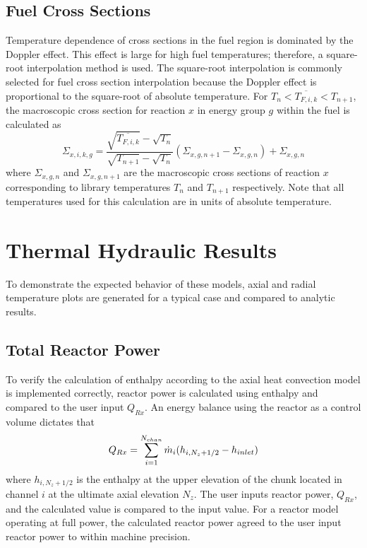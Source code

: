   \subsection{Fuel Cross Sections}
    Temperature dependence of cross sections in the fuel region is dominated by
    the Doppler effect. This effect is large for high fuel temperatures;
    therefore, a square-root interpolation method is used. The square-root
    interpolation is commonly selected for fuel cross section interpolation 
    because the Doppler effect is proportional to the square-root of absolute
    temperature. For ${T_n < \overline{T_{F,i,k}} < T_{n+1}}$, the macroscopic 
    cross section for reaction $x$ in energy group $g$ within the fuel is
    calculated as 
    \begin{equation}
      \Sigma_{x,i,k,g} = 
        \frac{\sqrt{\overline{T_{F,i,k}}} - \sqrt{T_{n}}}
        {\sqrt{T_{n+1}}-\sqrt{T_{n}}}
        (\Sigma_{x,g,n+1} - \Sigma_{x,g,n})  + \Sigma_{x,g,n}
    \end{equation}
    where $\Sigma_{x,g,n}$ and $\Sigma_{x,g,n+1}$ are the macroscopic
    cross sections of reaction $x$ corresponding to library temperatures $T_n$
    and $T_{n+1}$ respectively. Note that all temperatures used for this 
    calculation are in units of absolute temperature.
      
\section{Thermal Hydraulic Results}
  To demonstrate the expected behavior of these models, axial and radial
  temperature plots are generated for a typical case and compared to analytic
  results.
  
  \subsection{Total Reactor Power}
    To verify the calculation of enthalpy according to the axial heat convection
    model is implemented correctly, reactor power is calculated using enthalpy
    and compared to the user input $Q_{Rx}$. An energy balance using the reactor
    as a control volume dictates that
    \begin{equation}
      \label{eq:reactor_energy_balance}
      Q_{Rx} = \sum_{i=1}^{N_{chan}} \dot{m}_i (h_{i,N_z+1/2} - h_{inlet})
    \end{equation}
    where $h_{i,N_z+1/2}$ is the enthalpy at the upper elevation of the chunk
    located in channel $i$ at the ultimate axial elevation $N_z$. The user
    inputs reactor power, $Q_{Rx}$, and the calculated value is compared to the
    input value. For a reactor model operating at full power, the calculated
    reactor power agreed to the user input reactor power to within machine
    precision.

